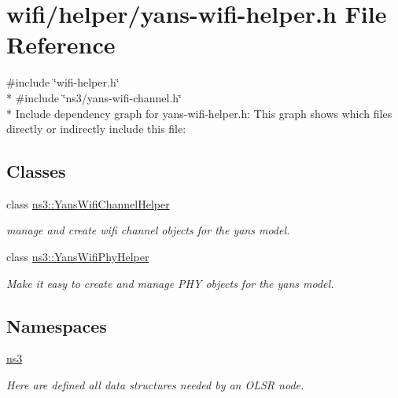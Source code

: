 \hypertarget{yans-wifi-helper_8h}{}\section{wifi/helper/yans-\/wifi-\/helper.h File Reference}
\label{yans-wifi-helper_8h}
{\ttfamily \#include \char`\"{}wifi-\/helper.\+h\char`\"{}}\\*
{\ttfamily \#include \char`\"{}ns3/yans-\/wifi-\/channel.\+h\char`\"{}}\\*
Include dependency graph for yans-\/wifi-\/helper.h\+:
This graph shows which files directly or indirectly include this file\+:
\subsection*{Classes}
\begin{DoxyCompactItemize}
\item 
class \hyperlink{classns3_1_1YansWifiChannelHelper}{ns3\+::\+Yans\+Wifi\+Channel\+Helper}
\begin{DoxyCompactList}\small\item\em manage and create wifi channel objects for the yans model. \end{DoxyCompactList}\item 
class \hyperlink{classns3_1_1YansWifiPhyHelper}{ns3\+::\+Yans\+Wifi\+Phy\+Helper}
\begin{DoxyCompactList}\small\item\em Make it easy to create and manage P\+HY objects for the yans model. \end{DoxyCompactList}\end{DoxyCompactItemize}
\subsection*{Namespaces}
\begin{DoxyCompactItemize}
\item 
 \hyperlink{namespacens3}{ns3}
\begin{DoxyCompactList}\small\item\em Here are defined all data structures needed by an O\+L\+SR node. \end{DoxyCompactList}\end{DoxyCompactItemize}
